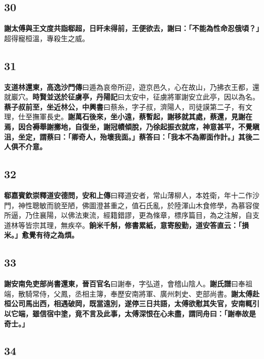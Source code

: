 \subsection*{30}

\textbf{謝太傅與王文度共詣郗超，日旰未得前，王便欲去，謝曰：「不能為性命忍俄頃？」}{\footnotesize 超得寵桓溫，專殺生之威。}

\subsection*{31}

\textbf{支道林還東，}{\footnotesize \textbf{高逸沙門傳}曰遁為哀帝所迎，遊京邑久，心在故山，乃拂衣王都，還就巖穴。}\textbf{時賢並送於征虜亭，}{\footnotesize \textbf{丹陽記}曰太安中，征虜將軍謝安立此亭，因以為名。}\textbf{蔡子叔前至，坐近林公，}{\footnotesize \textbf{中興書}曰蔡糸，字子叔，濟陽人，司徒謨第二子，有文理，仕至撫軍長史。}\textbf{謝萬石後來，坐小遠，蔡暫起，謝移就其處，蔡還，見謝在焉，因合褥舉謝擲地，自復坐，謝冠幘傾脫，乃徐起振衣就席，神意甚平，不覺瞋沮，坐定，謂蔡曰：「卿奇人，殆壞我面。」蔡答曰：「我本不為卿面作計。」其後二人俱不介意。}

\subsection*{32}

\textbf{郗嘉賓欽崇釋道安德問，}{\footnotesize \textbf{安和上傳}曰釋道安者，常山薄柳人，本姓衛，年十二作沙門，神性聰敏而貌至陋，佛圖澄甚重之，值石氏亂，於陸渾山木食修學，為慕容俊所逼，乃住襄陽，以佛法東流，經籍錯謬，更為條章，標序篇目，為之注解，自支道林等皆宗其理，無疾卒。}\textbf{餉米千斛，修書累紙，意寄殷勤，道安答直云：「損米。」愈覺有待之為煩。}

\subsection*{33}

\textbf{謝安南免吏部尚書還東，}{\footnotesize \textbf{晉百官名}曰謝奉，字弘道，會稽山陰人。\textbf{謝氏譜}曰奉祖端，散騎常侍，父鳳，丞相主簿，奉歷安南將軍、廣州刺史、吏部尚書。}\textbf{謝太傅赴桓公司馬出西，相遇破岡，既當遠別，遂停三日共語，太傅欲慰其失官，安南輒引以它端，雖信宿中塗，竟不言及此事，太傅深恨在心未盡，謂同舟曰：「謝奉故是奇士。」}

\subsection*{34}

